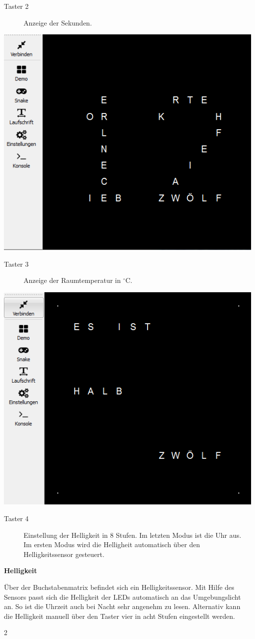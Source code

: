 \begin{multicols}{2}
\begin{description}
\item[Taster 2] Anzeige der Sekunden.
\end {description}
{
\centering\includegraphics[width=0.8\columnwidth]{Abbildungen/Funktionen/Sekunden_01}

}

\begin{description}
\item[Taster 3] Anzeige der Raumtemperatur in $^\circ$C.
\end {description}
{
\centering\includegraphics[width=0.8\columnwidth]{Abbildungen/Funktionen/Uhrzeit_01}

}

\begin{description}
\item[Taster 4] Einstellung der Helligkeit in 8 Stufen. Im letzten Modus ist die Uhr aus. Im ersten Modus wird die Helligheit automatisch über den Helligkeitssensor gesteuert.
\end {description}
 
\textbf{Helligkeit}

Über der Buchstabenmatrix befindet sich ein Helligkeitssensor. Mit Hilfe des Sensors passt sich die Helligkeit der LEDs automatisch an das Umgebungslicht an. So ist die Uhrzeit auch bei Nacht sehr angenehm zu lesen. Alternativ kann die Helligkeit manuell über den Taster vier in acht Stufen eingestellt werden.

\end{multicols}{2}